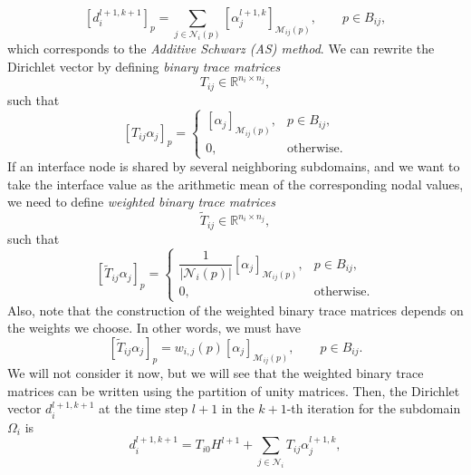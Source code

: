 \documentclass[a4paper, 11pt]{article}
\theoremstyle{plain}
\theoremstyle{definition}
\theoremstyle{remark}
\begin{document}
\begin{equation*}
    \left[d^{l+1, k+1}_{i}\right]_{p} = \sum\limits_{j\in\mathcal{N}_{i}(p)} \left[\alpha^{l+1, k}_{j}\right]_{\mathcal{M}_{ij}(p)}, \qquad p\in B_{ij},
\end{equation*}
which corresponds to the \textit{Additive Schwarz (AS) method}. We can rewrite the Dirichlet vector by defining \textit{binary trace matrices}
\begin{equation*}
    T_{ij} \in \mathbb{R}^{n_{i} \times n_{j}},
\end{equation*}
such that
\begin{equation*}
    \left[T_{ij}\alpha_{j}\right]_{p} = 
    \begin{cases}
        \left[\alpha_{j}\right]_{\mathcal{M}_{ij}(p)}, & p\in B_{ij},\\
        0, & \text{otherwise}.
    \end{cases}
\end{equation*}
If an interface node is shared by several neighboring subdomains, and we want to take the interface value as the arithmetic mean of the corresponding nodal values, we need to define \textit{weighted binary trace matrices}
\begin{equation*}
    \tilde{T}_{ij} \in \mathbb{R}^{n_{i} \times n_{j}},
\end{equation*}
such that
\begin{equation*}
    \left[\tilde{T}_{ij}\alpha_{j}\right]_{p} = 
    \begin{cases}
        \dfrac{1}{\lvert \mathcal{N}_{i}(p)\rvert}\left[\alpha_{j}\right]_{\mathcal{M}_{ij}(p)}, & p\in B_{ij},\\
        0, & \text{otherwise}.
    \end{cases}
\end{equation*}
Also, note that the construction of the weighted binary trace matrices depends on the weights we choose. In other words, we must have 
\begin{equation*}
    \left[\tilde{T}_{ij}\alpha_{j}\right]_{p} = w_{i, j}(p)\left[\alpha_{j}\right]_{\mathcal{M}_{ij}(p)}, \qquad p\in B_{ij}.
\end{equation*}
We will not consider it now, but we will see that the weighted binary trace matrices can be written using the partition of unity matrices. Then, the Dirichlet vector $d^{l+1, k+1}_{i}$ at the time step $l+1$ in the $k+1$-th iteration for the subdomain $\Omega_i$ is
\begin{equation*}
    d^{l+1, k+1}_{i} = T_{i0}H^{l+1} + \sum_{j\in\mathcal{N}_{i}}T_{ij}\alpha^{l+1, k}_{j},
\end{equation*}
\end{document}
